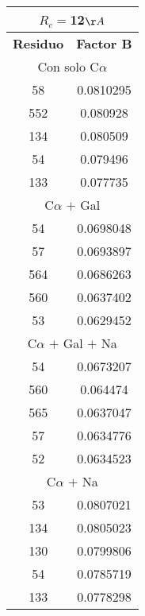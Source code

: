 \begin{tabular}[c]{|c|c|}
\multicolumn{2}{c}{$R_c=$12$\AA$}\\\hline
\textbf{Residuo}&\textbf{Factor B}\\\hline
\multicolumn{2}{c}{Con solo C$\alpha$}\\\hline
        58& 0.0810295\\
       552&  0.080928\\
       134&  0.080509\\
        54&  0.079496\\
       133&  0.077735\\\hline
\multicolumn{2}{c}{C$\alpha$ $+$ Gal}\\\hline
        54& 0.0698048\\
        57& 0.0693897\\
       564& 0.0686263\\
       560& 0.0637402\\
        53& 0.0629452\\\hline
\multicolumn{2}{c}{C$\alpha$ $+$ Gal $+$ Na}\\\hline
        54& 0.0673207\\
       560&  0.064474\\
       565& 0.0637047\\
        57& 0.0634776\\
        52& 0.0634523\\\hline
\multicolumn{2}{c}{C$\alpha$ $+$ Na}\\\hline
        53& 0.0807021\\
       134& 0.0805023\\
       130& 0.0799806\\
        54& 0.0785719\\
       133& 0.0778298\\\hline
\end{tabular}

